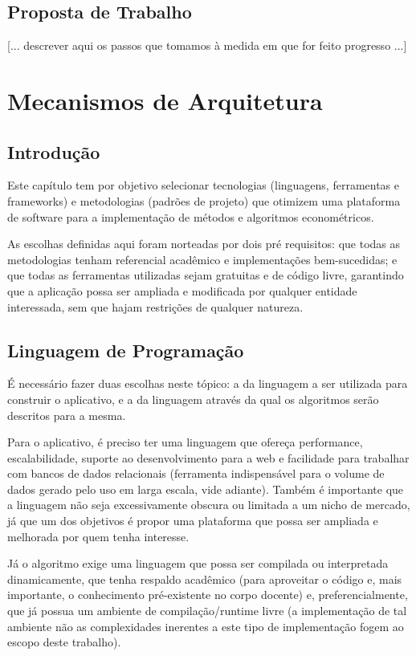 \documentclass{abnt}
\begin{document}
\section{Proposta de Trabalho}

[... descrever aqui os passos que tomamos à medida em que for feito progresso ...]

\chapter{Mecanismos de Arquitetura}
\section{Introdução}
Este capítulo tem por objetivo selecionar tecnologias (linguagens, ferramentas e frameworks) e metodologias (padrões de projeto) que otimizem uma plataforma de software para a implementação de métodos e algoritmos econométricos.

As escolhas definidas aqui foram norteadas por dois pré requisitos: que todas as metodologias tenham referencial acadêmico e implementações bem-sucedidas; e que todas as ferramentas utilizadas sejam gratuitas e de código livre, garantindo que a aplicação  possa ser ampliada e modificada por qualquer entidade interessada, sem que hajam restrições de qualquer natureza.
\section{Linguagem de Programação}
É necessário fazer duas escolhas neste tópico: a da linguagem a ser utilizada para construir o aplicativo, e a da linguagem através da qual os algoritmos serão descritos para a mesma.

Para o aplicativo, é preciso ter uma linguagem que ofereça performance, escalabilidade, suporte ao desenvolvimento para a web e facilidade para trabalhar com bancos de dados relacionais (ferramenta indispensável para o volume de dados gerado pelo uso em larga escala, vide adiante). Também é importante que a linguagem não seja excessivamente obscura ou limitada a um nicho de mercado, já que um dos objetivos é propor uma plataforma que possa ser ampliada e melhorada por quem tenha interesse.

Já o algoritmo exige uma linguagem que possa ser compilada ou interpretada dinamicamente, que tenha respaldo acadêmico (para aproveitar o código e, mais importante, o conhecimento pré-existente no corpo docente) e, preferencialmente, que já possua um ambiente de compilação/runtime livre (a implementação de tal ambiente não as complexidades inerentes a este tipo de implementação fogem ao escopo deste trabalho). 
\end{document}
